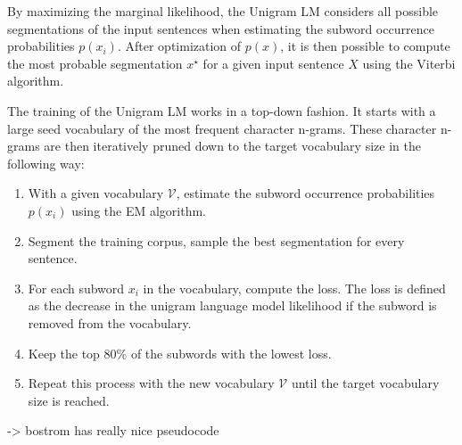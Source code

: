 By maximizing the marginal likelihood, the Unigram LM considers all possible segmentations of the input sentences when estimating the subword occurrence probabilities $p(x_i)$. After optimization of $p(x)$, it is then possible to compute the most probable segmentation $x^\star$ for a given input sentence $X$ using the Viterbi algorithm.

The training of the Unigram LM works in a top-down fashion. It starts with a large seed vocabulary of the most frequent character n-grams. These character n-grams are then iteratively pruned down to the target vocabulary size in the following way:

\begin{enumerate}
    \item With a given vocabulary $\mathcal{V}$, estimate the subword occurrence probabilities $p(x_i)$ using the EM algorithm.
    \item Segment the training corpus, sample the best segmentation for every sentence.
    \item For each subword $x_i$ in the vocabulary, compute the loss. The loss is defined as the decrease in the unigram language model likelihood if the subword is removed from the vocabulary.
    \item Keep the top 80\% of the subwords with the lowest loss.
    \item Repeat this process with the new vocabulary $\mathcal{V}$ until the target vocabulary size is reached.
\end{enumerate}

-> bostrom has really nice pseudocode








